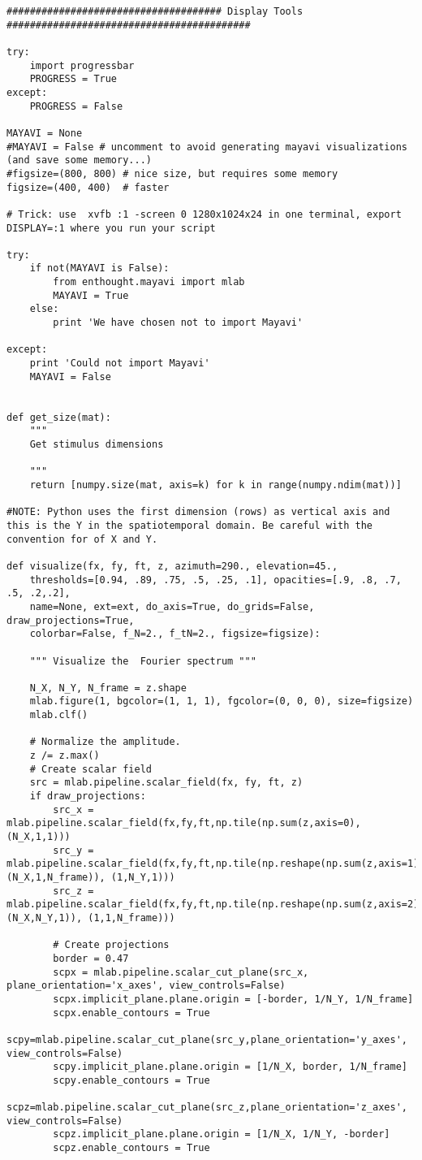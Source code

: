 \documentclass[a4paper,11pt]{article}%
\begin{document}
\begin{lstlisting}
##################################### Display Tools ##########################################

try:
    import progressbar
    PROGRESS = True
except:
    PROGRESS = False

MAYAVI = None
#MAYAVI = False # uncomment to avoid generating mayavi visualizations (and save some memory...)
#figsize=(800, 800) # nice size, but requires some memory
figsize=(400, 400)  # faster

# Trick: use  xvfb :1 -screen 0 1280x1024x24 in one terminal, export DISPLAY=:1 where you run your script

try:
    if not(MAYAVI is False):
        from enthought.mayavi import mlab
        MAYAVI = True
    else:
        print 'We have chosen not to import Mayavi'

except:
    print 'Could not import Mayavi'
    MAYAVI = False


def get_size(mat):
    """ 
    Get stimulus dimensions 

    """
    return [numpy.size(mat, axis=k) for k in range(numpy.ndim(mat))]

#NOTE: Python uses the first dimension (rows) as vertical axis and this is the Y in the spatiotemporal domain. Be careful with the convention for of X and Y.

def visualize(fx, fy, ft, z, azimuth=290., elevation=45., 
    thresholds=[0.94, .89, .75, .5, .25, .1], opacities=[.9, .8, .7, .5, .2,.2],
    name=None, ext=ext, do_axis=True, do_grids=False, draw_projections=True,
    colorbar=False, f_N=2., f_tN=2., figsize=figsize):
    
    """ Visualize the  Fourier spectrum """

    N_X, N_Y, N_frame = z.shape
    mlab.figure(1, bgcolor=(1, 1, 1), fgcolor=(0, 0, 0), size=figsize)
    mlab.clf()
    
    # Normalize the amplitude.
    z /= z.max() 
    # Create scalar field
    src = mlab.pipeline.scalar_field(fx, fy, ft, z)
    if draw_projections:
        src_x = mlab.pipeline.scalar_field(fx,fy,ft,np.tile(np.sum(z,axis=0),(N_X,1,1)))
        src_y = mlab.pipeline.scalar_field(fx,fy,ft,np.tile(np.reshape(np.sum(z,axis=1),(N_X,1,N_frame)), (1,N_Y,1)))
        src_z = mlab.pipeline.scalar_field(fx,fy,ft,np.tile(np.reshape(np.sum(z,axis=2),(N_X,N_Y,1)), (1,1,N_frame)))

        # Create projections
        border = 0.47
        scpx = mlab.pipeline.scalar_cut_plane(src_x, plane_orientation='x_axes', view_controls=False)
        scpx.implicit_plane.plane.origin = [-border, 1/N_Y, 1/N_frame]
        scpx.enable_contours = True
        scpy=mlab.pipeline.scalar_cut_plane(src_y,plane_orientation='y_axes', view_controls=False)
        scpy.implicit_plane.plane.origin = [1/N_X, border, 1/N_frame]
        scpy.enable_contours = True
        scpz=mlab.pipeline.scalar_cut_plane(src_z,plane_orientation='z_axes', view_controls=False)
        scpz.implicit_plane.plane.origin = [1/N_X, 1/N_Y, -border]
        scpz.enable_contours = True


\end{lstlisting}
\end{document}
